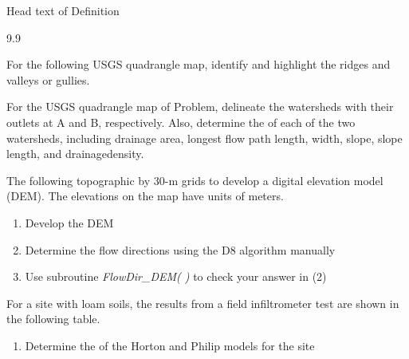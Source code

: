 \begin{definition}{Head text of Definition}
\lipsum[5]
\end{definition}

\lipsum[5]

\begin{chaptexbox}
\lipsum[5]




\lipsum[5]
\end{chaptexbox}

\lipsum[5]

\begin{problemlist}{9.9}
\item \label{ch01:prob3.1} For the following USGS quadrangle
    map, identify and highlight the ridges and valleys or
    gullies.

\begin{figure}[!h]
\hspace*{18pt}
\end{figure}

\item \label{ch01:prob3.2} For the USGS quadrangle map of
    Problem, delineate the watersheds with their outlets at A
    and B, respectively. Also, determine the of each of the two watersheds, including
    drainage area, longest flow path length, width, slope,
    slope length, and drainage\break density.

\item \label{ch01:prob3.3} The following topographic by 30-m grids to develop a digital
    elevation model (DEM). The elevations on the map have units
    of meters.
\begin{enumerate}[(3)]
\item[(1)] Develop the DEM

\item[(2)] Determine the flow directions using the D8 algorithm
manually

\item[(3)] Use subroutine \textit{FlowDir{\_}DEM( )} to check your
answer in (2)
\end{enumerate}

\item\label{ch01:prob3.15} For a site with loam soils, the
    results from a field infiltrometer test are shown in the
    following table.
\begin{enumerate}[(2)]
\item[(1)] Determine the of the Horton and Philip models for
the site


\end{enumerate}
\end{problemlist}
